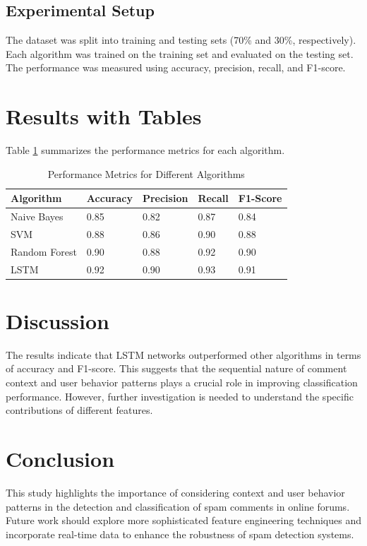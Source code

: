 \documentclass{article}
\begin{document}
\subsection{Experimental Setup}
The dataset was split into training and testing sets (70\% and 30\%, respectively). Each algorithm was trained on the training set and evaluated on the testing set. The performance was measured using accuracy, precision, recall, and F1-score.

\section{Results with Tables}
Table \ref{tab:results} summarizes the performance metrics for each algorithm.

\begin{table}[ht]
\centering
\caption{Performance Metrics for Different Algorithms}
\label{tab:results}
\begin{tabular}{@{}lllll@{}}
\toprule
Algorithm & Accuracy & Precision & Recall & F1-Score \\ \midrule
Naive Bayes & 0.85 & 0.82 & 0.87 & 0.84 \\
SVM & 0.88 & 0.86 & 0.90 & 0.88 \\
Random Forest & 0.90 & 0.88 & 0.92 & 0.90 \\
LSTM & 0.92 & 0.90 & 0.93 & 0.91 \\ \bottomrule
\end{tabular}
\end{table}

\section{Discussion}
The results indicate that LSTM networks outperformed other algorithms in terms of accuracy and F1-score. This suggests that the sequential nature of comment context and user behavior patterns plays a crucial role in improving classification performance. However, further investigation is needed to understand the specific contributions of different features.

\section{Conclusion}
This study highlights the importance of considering context and user behavior patterns in the detection and classification of spam comments in online forums. Future work should explore more sophisticated feature engineering techniques and incorporate real-time data to enhance the robustness of spam detection systems.
\end{document}
